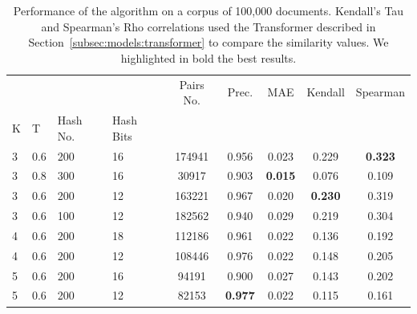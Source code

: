 \documentclass[runningheads]{llncs}
\begin{document}
\begin{table}
  \caption{Performance of the algorithm on a corpus of 100,000 documents. Kendall's Tau and Spearman's Rho correlations used the Transformer described in Section~\ref{subsec:models:transformer} to compare the similarity values. We highlighted in bold the best results.}
  \label{tab:experiments:d100k}
  \centering
  \begin{tabular}{llllccccc}
    \toprule
      &     &     &    &  Pairs No. &  Prec. &    MAE &  Kendall &  Spearman \\
    K & T & Hash No. & Hash Bits &            &        &        &          &           \\
    \midrule
    3 & 0.6 & 200 & 16 &     174941 &  0.956 &  0.023 &    0.229 &     \textbf{0.323} \\
      3 & 0.8 & 300 & 16 &      30917 &  0.903 &  \textbf{0.015} &    0.076 &     0.109 \\
      3 & 0.6 & 200 & 12 &     163221 &  0.967 &  0.020 &    \textbf{0.230} &     0.319 \\
      3 &   0.6  & 100 & 12 &     182562 &  0.940 &  0.029 &    0.219 &     0.304 \\
    4 & 0.6 & 200 & 18 &     112186 &  0.961 &  0.022 &    0.136 &     0.192 \\
    4  &   0.6  &  200   & 12 &     108446 &  0.976 &  0.022 &    0.148 &     0.205 \\
    5 & 0.6 & 200 & 16 &      94191 &  0.900 &  0.027 &    0.143 &     0.202 \\
    5  &  0.6   &  200   & 12 &      82153 &  \textbf{0.977} &  0.022 &    0.115 &     0.161 \\
    \bottomrule
    \end{tabular}
\end{table}
\end{document}
